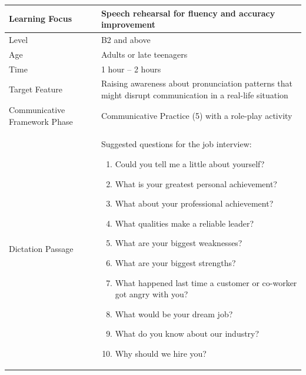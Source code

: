 \documentclass[english]{textolivre}
\begin{document}
\begin{tabular}{|m{3cm}|p{10cm}|}
\hline
Learning Focus & Speech rehearsal for fluency and accuracy improvement\\
\hline
Level & B2 and above\\
\hline
Age & Adults or late teenagers\\
\hline
Time & 1 hour -- 2 hours \\
\hline
Target Feature & Raising awareness about pronunciation patterns that might disrupt communication in a real-life situation\\
\hline
Communicative Framework Phase & Communicative Practice (5) with a role-play activity \\
\hline
Dictation Passage & Suggested questions for the job interview:
\begin{enumerate}
    \item Could you tell me a little about yourself?
    \item What is your greatest personal achievement?
    \item What about your professional achievement?
    \item What qualities make a reliable leader?
    \item What are your biggest weaknesses?
    \item What are your biggest strengths?
    \item What happened last time a customer or co-worker got angry with you?
    \item What would be your dream job?
    \item What do you know about our industry?
    \item Why should we hire you?
\end{enumerate}

\\
\hline
\end{tabular}
\end{document}
